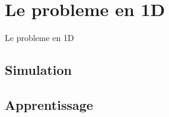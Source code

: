 
% 

\section{Le probleme en 1D}
Le probleme en 1D
\subsection{Simulation}

\subsection{Apprentissage}


% 
